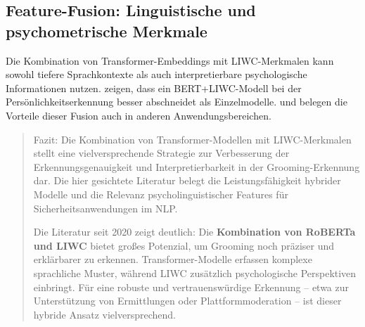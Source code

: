 \subsection{Feature-Fusion: Linguistische und psychometrische Merkmale}


Die Kombination von Transformer-Embeddings mit LIWC-Merkmalen kann sowohl tiefere Sprachkontexte als auch interpretierbare psychologische Informationen nutzen. \parencite{mehta2021liwcbert} zeigen, dass ein BERT+LIWC-Modell bei der Persönlichkeitserkennung besser abschneidet als Einzelmodelle. \parencite{rhouma2025worry} und \parencite{liu2023bliwcuda} belegen die Vorteile dieser Fusion auch in anderen Anwendungsbereichen.

\begin{quote}
Fazit: Die Kombination von Transformer-Modellen mit LIWC-Merkmalen stellt eine vielversprechende Strategie zur Verbesserung der Erkennungsgenauigkeit und Interpretierbarkeit in der Grooming-Erkennung dar. Die hier gesichtete Literatur belegt die Leistungsfähigkeit hybrider Modelle und die Relevanz psycholinguistischer Features für Sicherheitsanwendungen im NLP.


Die Literatur seit 2020 zeigt deutlich: Die \textbf{Kombination von RoBERTa und LIWC} bietet großes Potenzial, um Grooming noch präziser und erklärbarer zu erkennen. Transformer-Modelle erfassen komplexe sprachliche Muster, während LIWC zusätzlich psychologische Perspektiven einbringt. Für eine robuste und vertrauenswürdige Erkennung – etwa zur Unterstützung von Ermittlungen oder Plattformmoderation – ist dieser hybride Ansatz vielversprechend.
\end{quote}
